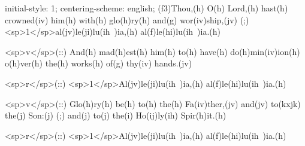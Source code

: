 initial-style: 1;
centering-scheme: english;
(f3)Thou,(h) O(h) Lord,(h) hast(h) crowned(iv) him(h) with(h) glo(h)ry(h) and(g) wor(iv)ship,(jv) (;) <sp>1</sp>al(jv)le(ji)lu(ih~)ia,(h) al(f)le(hi)lu(ih~)ia.(h) 

<sp>v</sp>(::) And(h) mad(h)est(h) him(h) to(h) have(h) do(h)min(iv)ion(h) o(h)ver(h) the(h) works(h) of(g) thy(iv) hands.(jv)

<sp>r</sp>(::) <sp>1</sp>Al(jv)le(ji)lu(ih~)ia,(h) al(f)le(hi)lu(ih~)ia.(h) 

<sp>v</sp>(::) Glo(h)ry(h) be(h) to(h) the(h) Fa(iv)ther,(jv) and(jv) to(kxjk) the(j) Son:(j) (;) and(j) to(j) the(i) Ho(ij)ly(ih) Spir(h)it.(h)

<sp>r</sp>(::) <sp>1</sp>Al(jv)le(ji)lu(ih~)ia,(h) al(f)le(hi)lu(ih~)ia.(h) 